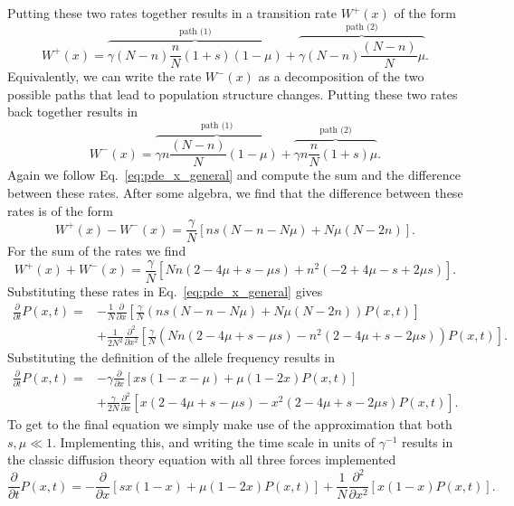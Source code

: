 Putting these two rates together results in a transition rate $W^{+}(x)$ of the
form
\begin{equation}
    W^{+}(x) = 
    \overbrace{\gamma(N-n) \frac{n}{N}(1+s) (1-\mu)}^{\text{path (1)}}
    + \overbrace{\gamma(N-n) \frac{(N-n)}{N} \mu}^{\text{path (2)}}.
\end{equation}
Equivalently, we can write the rate $W^{-}(x)$ as a decomposition of the two 
possible paths that lead to population structure changes. Putting these two 
rates back together results in
\begin{equation}
    W^{-}(x)=
    \overbrace{\gamma n \frac{(N-n)}{N}(1-\mu)}^{\text{path (1)}}
    +\overbrace{\gamma n \frac{n}{N}(1+s) \mu}^{\text{path (2)}}.
\end{equation}
Again we follow Eq.~\ref{eq:pde_x_general} and compute the sum and the
difference between these rates. After some algebra, we find that the difference
between these rates is of the form
\begin{equation}
    W^+(x) - W^-(x) = 
    \frac{\gamma}{N}\left[n s\left(N-n-N\mu\right)+N{\mu}(N-2 n)\right].
\end{equation}
For the sum of the rates we find
\begin{equation}
    W^+(x) + W^-(x) =
    \frac{\gamma}{N}\left[N n(2-4 \mu+s-\mu s) + 
    n^{2}(-2+4 \mu-s+2 \mu s)\right].
\end{equation}
Substituting these rates in Eq.~\ref{eq:pde_x_general} gives
\begin{equation}
\begin{split}
    \frac{\partial}{\partial t} P(x, t)=
    &-\frac{1}{N} \frac{\partial}{\partial x}
    \left[ \frac{\gamma}{N} \left(n s \left(N - n - N \mu \right)+
    N \mu (N - 2 n) \right) P(x, t)\right] \\
    & + \frac{1}{2 N^{2}} \frac{\partial^2}{\partial x^{2}}
    \left[\frac{\gamma}{N}\left(N n (2 - 4 \mu+s-\mu s)
    -n^{2}\left(2-4 \mu+s-2\mu s\right)\right) P(x, t)\right].
\end{split}
\end{equation}
Substituting the definition of the allele frequency results in
\begin{equation}
\begin{split}
    \frac{\partial}{\partial t} P(x, t)=
    &-\gamma \frac{\partial}{\partial x}[x s(1-x-\mu)+\mu(1-2 x) P(x, t)] \\
    &+\frac{\gamma}{2 N} \frac{\partial^{2}}{\partial x}
    \left[x(2-4 \mu+s-\mu s)-x^{2}(2-4 \mu+s-2 \mu s) P(x, t)\right].
\end{split}
\end{equation}
To get to the final equation we simply make use of the approximation that both
$s, \mu \ll 1$. Implementing this, and writing the time scale in units of
$\gamma^{-1}$ results in the classic diffusion theory equation with all three
forces implemented
\begin{equation}
    \frac{\partial}{\partial t} P(x, t) =
    -\frac{\partial}{\partial x}[s x(1-x) + \mu (1 - 2x) P(x, t)] 
    +\frac{1}{N} \frac{\partial^{2}}{\partial x^{2}}[x(1-x) P(x, t)].
\end{equation}